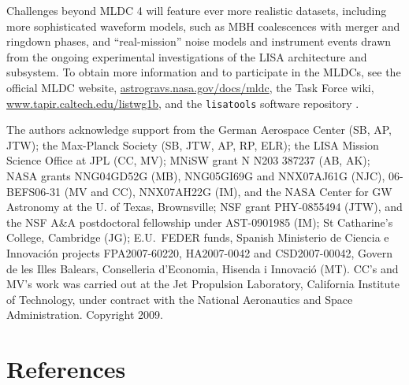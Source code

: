 \documentclass{iopart}
\begin{document}
Challenges beyond MLDC 4 will feature ever more realistic datasets, including more sophisticated waveform models, such as MBH coalescences with merger and ringdown phases, and ``real-mission'' noise models and instrument events drawn from the ongoing experimental investigations of the LISA architecture and subsystem. To obtain more information and to participate in the MLDCs, see the official MLDC website, \url{astrogravs.nasa.gov/docs/mldc}, the Task Force wiki, \url{www.tapir.caltech.edu/listwg1b}, and the \texttt{lisatools} software repository \cite{lisatools}.


\ack The authors acknowledge support from
the German Aerospace Center (SB, AP, JTW);
the Max-Planck Society (SB, JTW, AP, RP, ELR);
the LISA Mission Science Office at JPL (CC, MV);
MNiSW grant N N203 387237 (AB, AK);
NASA grants NNG04GD52G (MB),
  NNG05GI69G and NNX07AJ61G (NJC),
  06-BEFS06-31 (MV and CC),
  NNX07AH22G (IM),
  and the NASA Center for GW Astronomy at the U. of Texas, Brownsville;
NSF grant PHY-0855494 (JTW),
  and the NSF A\&A postdoctoral fellowship under AST-0901985 (IM);
St Catharine's College, Cambridge (JG);
E.U.\ FEDER funds, Spanish Ministerio de Ciencia e Innovaci\'on projects FPA2007-60220, HA2007-0042 and CSD2007-00042, Govern de les Illes Balears, Conselleria d'Economia, Hisenda i Innovaci\'o (MT).
CC's and MV's work was carried out at the Jet Propulsion Laboratory, California Institute of Technology, under contract with the National Aeronautics and Space Administration. Copyright 2009.

\section*{References}
\end{document}
